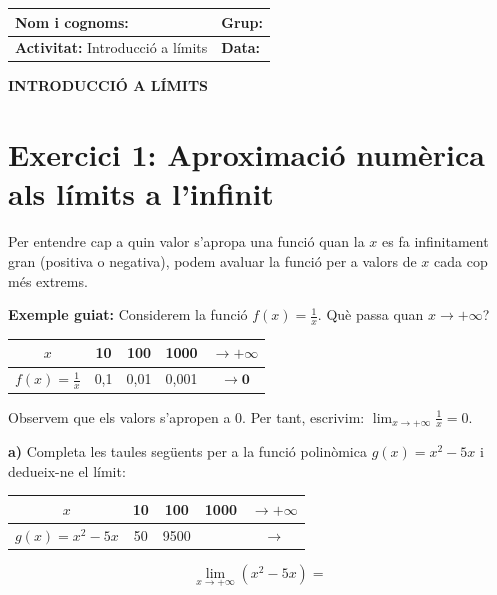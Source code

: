 \documentclass[12pt,a4paper]{article}
\begin{document}
\begingroup
\renewcommand{\arraystretch}{2.2}
\begin{tabularx}{\textwidth}{|X|p{4cm}|}
    \hline
    \textbf{Nom i cognoms:} & \textbf{Grup:} \\ \hline
    \textbf{Activitat:} Introducció a límits & \textbf{Data:} \\ \hline
\end{tabularx}
\endgroup

\vspace{0.8cm}

\begin{center}
    {\Large \textbf{INTRODUCCIÓ A LÍMITS}}
\end{center}

\section*{Exercici 1: Aproximació numèrica als límits a l'infinit}

Per entendre cap a quin valor s'apropa una funció quan la $x$ es fa infinitament gran (positiva o negativa), podem avaluar la funció per a valors de $x$ cada cop més extrems.

\textbf{Exemple guiat:} Considerem la funció $f(x) = \frac{1}{x}$. Què passa quan $x \to +\infty$?
\begin{center}
\renewcommand{\arraystretch}{1.5}
\begin{tabular}{|c|c|c|c|c|}
\hline
$x$ & 10 & 100 & 1000 & $\to +\infty$ \\ \hline
$f(x) = \frac{1}{x}$ & 0,1 & 0,01 & 0,001 & $\to \mathbf{0}$ \\ \hline
\end{tabular}
\end{center}
Observem que els valors s'apropen a 0. Per tant, escrivim: $\lim_{x\to +\infty} \frac{1}{x} = 0$.

\vspace{0.5cm}
\textbf{a)} Completa les taules següents per a la funció polinòmica $g(x) = x^2 - 5x$ i dedueix-ne el límit:

\begin{center}
\renewcommand{\arraystretch}{1.5}
\begin{tabular}{|c|c|c|c|c|}
\hline
$x$ & 10 & 100 & 1000 & $\to +\infty$ \\ \hline
$g(x) = x^2 - 5x$ & 50 & 9500 & \hspace{2cm} & $\to$ \hspace{1cm} \\ \hline
\end{tabular}
\end{center}
$$ \lim_{x\to +\infty} (x^2 - 5x) = $$
\end{document}

